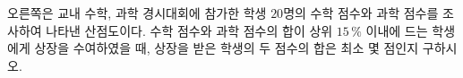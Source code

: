 \noindent\begin{minipage}[t]{0.58\linewidth}\vspace{0pt}\raggedright 오른쪽은 교내 수학, 과학 경시대회에 참가한 학생 $20$명의 수학 점수와 과학 점수를 조사하여 나타낸 산점도이다. 수학 점수와 과학 점수의 합이 상위 $15\,\%$ 이내에 드는 학생에게 상장을 수여하였을 때, 상장을 받은 학생의 두 점수의 합은 최소 몇 점인지 구하시오.\end{minipage}\hfill\begin{minipage}[t]{0.4\linewidth}\vspace{0pt}\centering \resizebox{\ifdim\width>\linewidth\linewidth\else\width\fi}{!}{}\end{minipage}\par
